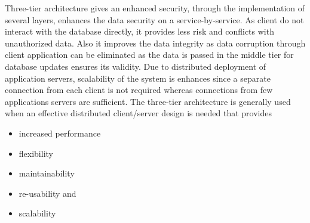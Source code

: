     Three-tier architecture gives an enhanced security, through the implementation of several layers, enhances the data security on a service-by-service. As client do not interact with the database directly, it provides less risk and conflicts with unauthorized data. Also it improves the data integrity as data corruption through client application can be eliminated as the data is passed in the middle tier for database updates ensures its validity. Due to distributed deployment of application servers, scalability of the system is enhances since a separate connection from each client is not required whereas connections from few applications servers are sufficient.
    \newline
    \newline
    The three-tier architecture is generally used when an effective   distributed client/server design is needed that provides
    \begin{itemize}
        \item increased performance
        \item flexibility
        \item maintainability
        \item re-usability and
        \item scalability
    \end{itemize}

